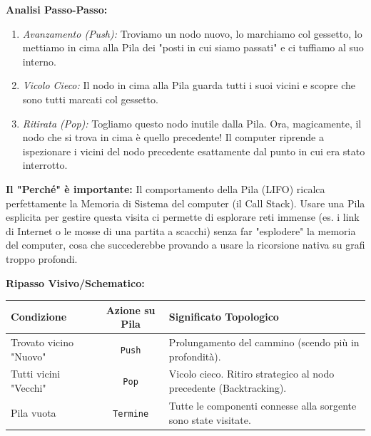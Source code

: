 \documentclass[a4paper, 11pt]{report}
\begin{document}
\textbf{Analisi Passo-Passo:}
\begin{enumerate}
    \item \textit{Avanzamento (Push):} Troviamo un nodo nuovo, lo marchiamo col gessetto, lo mettiamo in cima alla Pila dei "posti in cui siamo passati" e ci tuffiamo al suo interno.
    \item \textit{Vicolo Cieco:} Il nodo in cima alla Pila guarda tutti i suoi vicini e scopre che sono tutti marcati col gessetto.
    \item \textit{Ritirata (Pop):} Togliamo questo nodo inutile dalla Pila. Ora, magicamente, il nodo che si trova in cima è quello precedente! Il computer riprende a ispezionare i vicini del nodo precedente esattamente dal punto in cui era stato interrotto.
\end{enumerate}

\textbf{Il "Perché" è importante:}
Il comportamento della Pila (LIFO) ricalca perfettamente la Memoria di Sistema del computer (il Call Stack). Usare una Pila esplicita per gestire questa visita ci permette di esplorare reti immense (es. i link di Internet o le mosse di una partita a scacchi) senza far "esplodere" la memoria del computer, cosa che succederebbe provando a usare la ricorsione nativa su grafi troppo profondi.

\textbf{Ripasso Visivo/Schematico:}
\begin{center}
\begin{tabular}{|l|c|p{7cm}|}
\hline
\textbf{Condizione} & \textbf{Azione su Pila} & \textbf{Significato Topologico} \\
\hline
Trovato vicino "Nuovo" & \texttt{Push} & Prolungamento del cammino (scendo più in profondità). \\
\hline
Tutti vicini "Vecchi" & \texttt{Pop} & Vicolo cieco. Ritiro strategico al nodo precedente (Backtracking). \\
\hline
Pila vuota & \texttt{Termine} & Tutte le componenti connesse alla sorgente sono state visitate. \\
\hline
\end{tabular}
\end{center}
\end{document}
